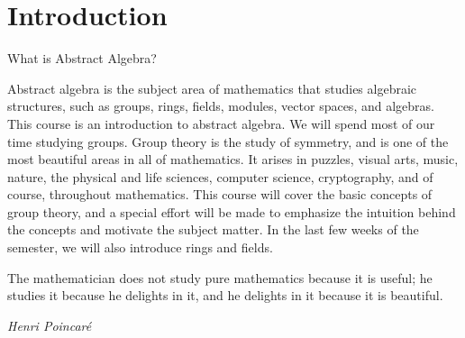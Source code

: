 \chapter{Introduction}

\begin{section}{What is Abstract Algebra?}

Abstract algebra is the subject area of mathematics that studies algebraic structures, such as groups, rings, fields, modules, vector spaces, and algebras. This course is an introduction to abstract algebra. We will spend most of our time studying groups. Group theory is the study of symmetry, and is one of the most beautiful areas in all of mathematics. It arises in puzzles, visual arts, music, nature, the physical and life sciences, computer science, cryptography, and of course, throughout mathematics. This course will cover the basic concepts of group theory, and a special effort will be made to emphasize the intuition behind the concepts and motivate the subject matter.  In the last few weeks of the semester, we will also introduce rings and fields.
\epigraph{The mathematician does not study pure mathematics because it is useful; he studies it because he delights in it, and he delights in it because it is beautiful.}{\emph{Henri Poincar\'e}}

\end{section}

